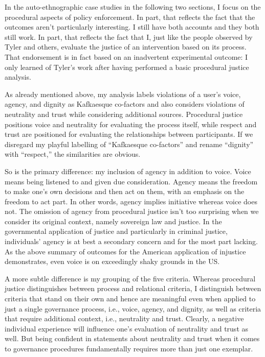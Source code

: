 In the auto-ethnographic case studies in the following two sections, I focus on
the procedural aspects of policy enforcement. In part, that reflects the fact
that the outcomes aren't particularly interesting. I still have both accounts
and they both still work. In part, that reflects the fact that I, just like the
people observed by Tyler and others, evaluate the justice of an intervention
based on its process. That endorsement is in fact based on an inadvertent
experimental outcome: I only learned of Tyler's work after having performed a
basic procedural justice analysis.

As already mentioned above, my analysis labels violations of a user's voice,
agency, and dignity as Kafkaesque co-factors and also considers violations of
neutrality and trust while considering additional sources. Procedural justice
positions voice and neutrality for evaluating the process itself, while respect
and trust are positioned for evaluating the relationships between participants.
If we disregard my playful labelling of ``Kafkaesque co-factors'' and rename
``dignity'' with ``respect,'' the similarities are obvious.

So is the primary difference: my inclusion of agency in addition to voice. Voice
means being listened to and given due consideration. Agency means the freedom to
make one's own decisions and then act on them, with an emphasis on the freedom
to act part. In other words, agency implies initiative whereas voice does not.
The omission of agency from procedural justice isn't too surprising when we
consider its original context, namely sovereign law and justice. In the
governmental application of justice and particularly in criminal justice,
individuals' agency is at best a secondary concern and for the most part
lacking. As the above summary of outcomes for the American application of
injustice demonstrates, even voice is on exceedingly shaky grounds in the US.

A more subtle difference is my grouping of the five criteria. Whereas procedural
justice distinguishes between process and relational criteria, I distinguish
between criteria that stand on their own and hence are meaningful even when
applied to just a single governance process, i.e., voice, agency, and dignity,
as well as criteria that require additional context, i.e., neutrality and trust.
Clearly, a negative individual experience will influence one's evaluation of
neutrality and trust as well. But being confident in statements about neutrality
and trust when it comes to governance procedures fundamentally requires more
than just one exemplar.

